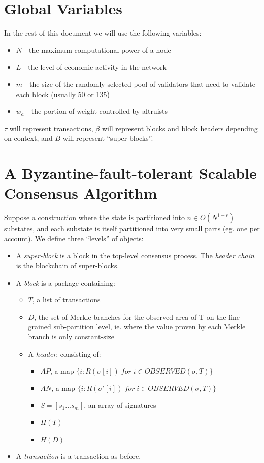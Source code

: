 \documentclass[11pt,a4paper]{report}
\theoremstyle{plain}
\theoremstyle{definition}
\theoremstyle{remark}
\begin{document}
\chapter{Global Variables}

In the rest of this document we will use the following variables:

\begin{itemize}
\item
$N$ - the maximum computational power of a node
\item
$L$ - the level of economic activity in the network
\item
$m$ - the size of the randomly selected pool of validators that need to validate each block (usually 50 or 135)
\item
$w_a$ - the portion of weight controlled by altruists
\end{itemize}

$\tau$ will represent transactions, $\beta$ will represent blocks and block headers depending on context, and $B$ will represent ``super-blocks''.

\chapter{A Byzantine-fault-tolerant Scalable Consensus Algorithm}

Suppose a construction where the state is partitioned into $n \in O(N^{1-\epsilon})$ substates, and each substate is itself partitioned into very small parts (eg. one per account). We define three ``levels'' of objects:

\begin{itemize}
\item
A \emph{super-block} is a block in the top-level consensus process. The \emph{header chain} is the blockchain of super-blocks.
\item
A \emph{block} is a package containing:

    \begin{itemize}
    \item
    $T$, a list of transactions
    \item
    $D$, the set of Merkle branches for the observed area of T on the fine-grained sub-partition level, ie. where the value proven by each Merkle branch is only constant-size
    \item
    A \emph{header}, consisting of:
        \begin{itemize}
        \item
        $AP$, a map $\{i: R(\sigma[i]) \; for \; i \in OBSERVED(\sigma, T)\}$
        \item
        $AN$, a map $\{i: R(\sigma'[i]) \; for \; i \in OBSERVED(\sigma, T)\}$
        \item
        $S = [s_1 ... s_m]$, an array of signatures
        \item
        $H(T)$
        \item
        $H(D)$
        \end{itemize}
    \end{itemize}
\item
A \emph{transaction} is a transaction as before.
\end{itemize}
\end{document}
